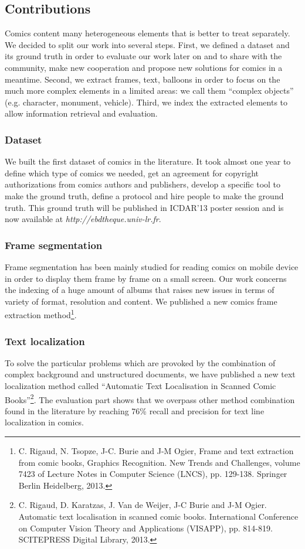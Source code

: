 \documentclass[final,12pt]{report} 						%
\begin{document}
\subsection{Contributions}
Comics content many heterogeneous elements that is better to treat separately. We decided to split our work into several steps. First, we defined a dataset and its ground truth in order to evaluate our work later on and to share with the community, make new cooperation and propose new solutions for comics in a meantime. Second, we extract frames, text, balloons in order to focus on the much more complex elements in a limited areas: we call them ``complex objects'' (e.g. character, monument, vehicle). Third, we index the extracted elements to allow information retrieval and evaluation.

\subsubsection{Dataset}
We built the first dataset of comics in the literature. It took almost one year to define which type of comics we needed, get an agreement for copyright authorizations from comics authors and publishers, develop a specific tool to make the ground truth, define a protocol and hire people to make the ground truth. This ground truth will be published in ICDAR'13 poster session and is now available at \textit{http://ebdtheque.univ-lr.fr}.

\subsubsection{Frame segmentation}
Frame segmentation has been mainly studied for reading comics on mobile device in order to display them frame by frame on a small screen. Our work concerns the indexing of a huge amount of albums that raises new issues in terms of variety of format, resolution and content. We published a new comics frame extraction method\footnote{C. Rigaud, N. Tsopze, J-C. Burie and J-M Ogier, Frame and text extraction from comic books, 
Graphics Recognition. New Trends and Challenges, volume 7423 of Lecture Notes in
Computer Science (LNCS), pp. 129-138. Springer Berlin Heidelberg, 2013.
}.

\subsubsection{Text localization}
To solve the particular problems which are provoked by the combination of complex background and unstructured documents, we have published a new text localization method called ``Automatic Text Localisation in Scanned Comic Books''\footnote{C. Rigaud, D. Karatzas, J. Van de Weijer, J-C Burie and J-M Ogier. Automatic text localisation in scanned comic books. International Conference on Computer Vision Theory and Applications (VISAPP), pp. 814-819. SCITEPRESS Digital Library, 2013.}. The evaluation part shows that we overpass other method combination found in the literature by reaching 76\% recall and precision for text line localization in comics. 
\end{document}
